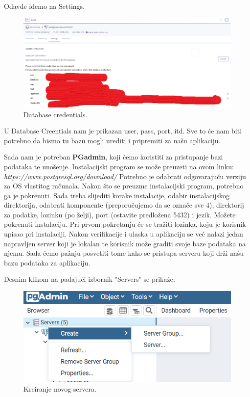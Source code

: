 		 	Odavde idemo na Settings.
		 	
		 	
		 	\begin{figure}[H]
		 		\includegraphics[scale=0.3]{slike/Datacredentials.png} 
		 		\centering
		 		\caption{ Database credentials.}
		 		\label{DS}
		 	\end{figure}
			 
			 U Database Creentials nam je prikazan user, pass, port, itd. Sve to će nam biti potrebno da bismo tu bazu mogli urediti i pripremiti za našu aplikaciju.
			 
			 Sada nam je potreban \textbf{PGadmin}, koji ćemo koristiti za pristupanje bazi podataka te unošenje. Instalacijski program se može preuzeti na ovom linku: \textit{https://www.postgresql.org/download/} Potrebno je odabrati odgovarajuću verziju za OS vlastitog računala. Nakon što se preuzme instalacijski program, potrebno ga je pokrenuti. Sada treba slijediti korake instalacije, odabir instalacijskog direktorija, odabrati komponente (preporučujemo da se označe sve 4), direktorij za podatke, lozinku (po želji), port (ostavite predložena 5432) i jezik. Možete pokrenuti instalaciju. Pri prvom pokretanju će se tražiti lozinka, koju je korisnik upisao pri instalaciji. Nakon verifikacije i ulaska u aplikaciju se već nalazi jedan napravljen server koji je lokalan te korisnik može graditi svoje baze podataka na njemu. Sada ćemo pažnju posvetiti tome kako se pristupa serveru koji drži našu bazu podataka za aplikaciju.
			 
			 Desnim klikom na padajući izbornik "Servers" se prikaže:
			 
			 \begin{figure}[H]
			 	\includegraphics[scale=1]{slike/novi server.png} 
			 	\centering
			 	\caption{ Kreiranje novog servera.}
			 	\label{DS}
			 \end{figure}
		 	

